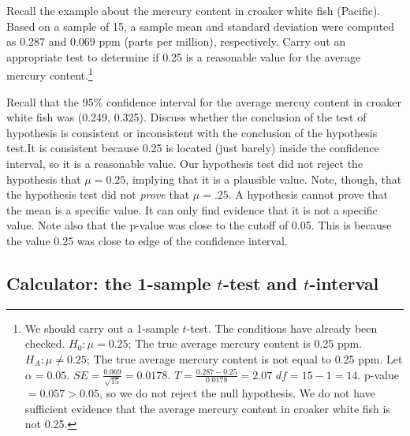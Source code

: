 \begin{exercise}Recall the example about the mercury content in croaker white fish (Pacific). Based on a sample of 15, a sample mean and standard deviation were computed as 0.287 and 0.069 ppm (parts per million), respectively. Carry out an appropriate test to determine if 0.25 is a reasonable value for the average mercury content.\footnote{We should carry out a 1-sample $t$-test. The conditions have already been checked. $H_0: \mu=0.25$; The true average mercury content is 0.25 ppm. $H_A: \mu \ne 0.25$; The true average mercury content is not equal to 0.25 ppm. Let $\alpha=0.05$. $SE = \frac{0.069}{\sqrt{15}} = 0.0178$. $T=\frac{0.287-0.25}{0.0178}=2.07$  $df=15-1=14$. p-value$=0.057>0.05$, so we do not reject the null hypothesis. We do not have sufficient evidence that the average mercury content in croaker white fish is not 0.25.}
\end{exercise}

\begin{example}{Recall that the 95\% confidence interval for the average mercuy content in croaker white fish was (0.249, 0.325). Discuss whether the conclusion of the test of hypothesis is consistent or inconsistent with the conclusion of the hypothesis test.}It is consistent because 0.25 is located (just barely) inside the confidence interval, so it is a reasonable value. Our hypothesis test did not reject the hypothesis that $\mu=0.25$, implying that it is a plausible value. Note, though, that the hypothesis test did not \emph{prove} that $\mu=.25$. A hypothesis cannot prove that the mean is a specific value. It can only find evidence that it is not a specific value. Note also that the p-value was close to the cutoff of 0.05. This is because the value 0.25 was close to edge of the confidence interval.
\end{example}

\subsection{Calculator: the 1-sample $t$-test and $t$-interval}

